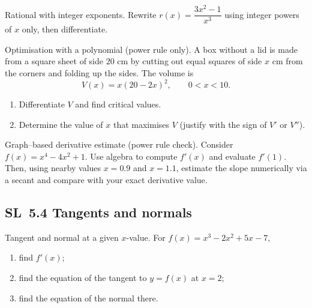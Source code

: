 \documentclass[11pt]{article}
\def\textbf#1{#1}%
\newcommand{\tocsubsection}[1]{\subsection{#1}}
\newcounter{question}
\begin{document}
\begin{question}
\textbf{Rational with integer exponents.}
Rewrite $r(x)=\dfrac{3x^{2}-1}{x^{3}}$ using integer powers of $x$ only, then differentiate.
\end{question}

\begin{question}
\textbf{Optimisation with a polynomial (power rule only).}
A box without a lid is made from a square sheet of side $20$ cm by cutting out equal squares of side $x$ cm from the corners and folding up the sides. The volume is
\[
V(x)=x(20-2x)^{2},\qquad 0<x<10.
\]
\begin{enumerate}
  \item Differentiate $V$ and find critical values.
  \item Determine the value of $x$ that maximises $V$ (justify with the sign of $V'$ or $V''$).
\end{enumerate}
\end{question}

\begin{question}
\textbf{Graph–based derivative estimate (power rule check).}
Consider $f(x)=x^{4}-4x^{2}+1$. Use algebra to compute $f'(x)$ and evaluate $f'(1)$. Then, using nearby values $x=0.9$ and $x=1.1$, estimate the slope numerically via a secant and compare with your exact derivative value.
\end{question}





\tocsubsection{SL 5.4 \; Tangents and normals}


\begin{question}
\textbf{Tangent and normal at a given $x$-value.}
For $f(x)=x^3-2x^2+5x-7$,
\begin{enumerate}
  \item find $f'(x)$;
  \item find the equation of the tangent to $y=f(x)$ at $x=2$;
  \item find the equation of the normal there.
\end{enumerate}
\end{question}
\end{document}
